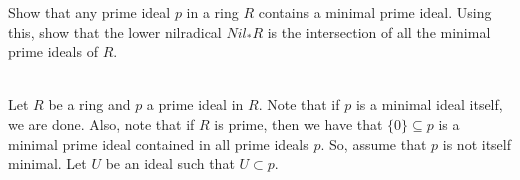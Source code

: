 Show that any prime ideal $p$ in a ring $R$ contains a minimal prime ideal. Using this, show that the
lower nilradical $Nil_* R$ is the intersection of all the minimal prime ideals of $R$.\\

\begin{solution}\renewcommand{\qedsymbol}{}\ \\
    Let $R$ be a ring and $p$ a prime ideal in $R$. Note that if $p$ is a minimal ideal itself, we are
    done. Also, note that if $R$ is prime, then we have that $\{0\}\subseteq p$ is a minimal prime ideal
    contained in all prime ideals $p$. So, assume that $p$ is not itself minimal. Let $U$ be an ideal
    such that $U\subset p$.

\end{solution}